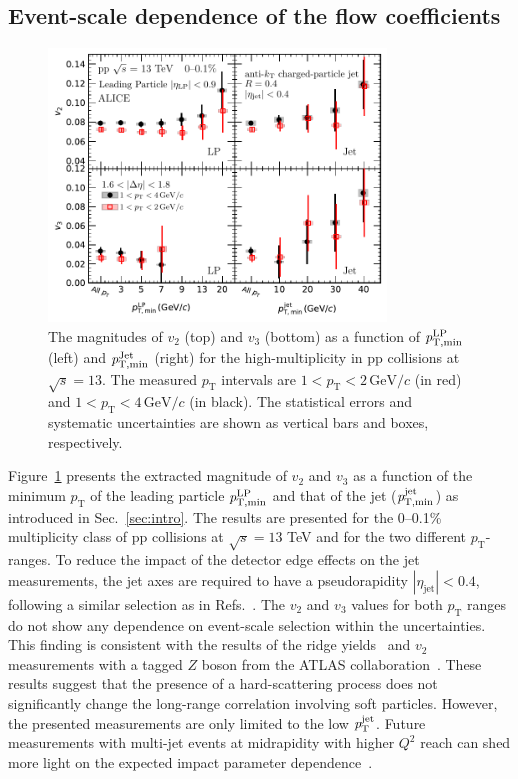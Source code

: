 \subsection{Event-scale dependence of the flow coefficients}
\begin{figure}[h!]
	\centering
	\hspace{-3em}\includegraphics[width=0.8\textwidth]{figures/FIG6_vn_LP.pdf}
	\caption{The magnitudes of $v_2$ (top) and $v_3$ (bottom) as a function of $\it{p}^{\rm{LP}}_{\rm{T,min}}$ (left) and $\it{p}^{\rm{Jet}}_{\rm{T,min}}$ (right) for the high-multiplicity in pp collisions at $\sqrt{s}=13$. The measured $p_{\mathrm{T}}$ intervals are $1<p_{\mathrm{T}}<2\,\mathrm{GeV}/c$ (in red) and $1<p_{\mathrm{T}}<4\,\mathrm{GeV}/c$ (in black). The statistical errors and systematic uncertainties are shown as vertical bars and boxes, respectively.}
	\label{fig:LPjet23}
\end{figure}    

Figure~\ref{fig:LPjet23} presents the extracted magnitude of $v_2$ and $v_3$ as a function of the minimum $p_\mathrm{T}$ of the leading particle $\it{p}^{\rm{LP}}_{\rm{T,min}}$ and that of the jet ($\it{p}^{\rm{jet}}_{\rm{T,min}}$) as introduced in Sec.~\ref{sec:intro}. 
The results are presented for the 0–0.1\% multiplicity class of pp collisions at $\sqrt{s}= 13$ TeV and for the two different $p_\mathrm{T}$-ranges.
To reduce the impact of the detector edge effects on the jet measurements, the jet axes are required to have a pseudorapidity $|\eta_\mathrm{jet}|<0.4$, following a similar selection as in Refs.~\cite{CDF:2001onq, ATLAS:2014riz, CMS:2015jdl}. The $v_2$ and $v_3$ values for both $p_\mathrm{T}$ ranges do not show any dependence on event-scale selection within the uncertainties. This finding is consistent with the results of the ridge yields~\cite{ALICE:2021nir} and $v_{2}$ measurements with a tagged $Z$ boson from the ATLAS collaboration~\cite{Aaboud:2019mcw}. These results suggest that the presence of a hard-scattering process does not significantly change the long-range correlation involving soft particles.
However, the presented measurements are only limited to the low $\it{p}^{\rm{jet}}_{\rm{T}}$. Future measurements with multi-jet events at midrapidity with higher $Q^2$ reach can shed more light on the expected impact parameter dependence~\cite{Sjostrand:1986ep,Frankfurt:2003td,Frankfurt:2010ea}.

